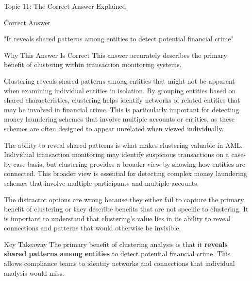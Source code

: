 \documentclass[8pt]{beamer}  %
\newcommand{\correct}{\textcolor{correctgreen}{\ding{51}}}
\begin{document}
	\begin{frame}{Topic 11: The Correct Answer Explained}
		\begin{block}{\large \correct \textcolor{correctgreen}{Correct Answer}}
			\begin{center}
				\Large "It reveals shared patterns among entities to detect potential financial crime"
			\end{center}
		\end{block}
		
		\vspace{0.2cm}
		\begin{block}{\large Why This Answer Is Correct}
			This answer accurately describes the primary benefit of clustering within transaction monitoring systems.
			
			Clustering reveals shared patterns among entities that might not be apparent when examining individual entities in isolation. By grouping entities based on shared characteristics, clustering helps identify networks of related entities that may be involved in financial crime. This is particularly important for detecting money laundering schemes that involve multiple accounts or entities, as these schemes are often designed to appear unrelated when viewed individually.
			
			The ability to reveal shared patterns is what makes clustering valuable in AML. Individual transaction monitoring may identify suspicious transactions on a case-by-case basis, but clustering provides a broader view by showing how entities are connected. This broader view is essential for detecting complex money laundering schemes that involve multiple participants and multiple accounts.
			
			The distractor options are wrong because they either fail to capture the primary benefit of clustering or they describe benefits that are not specific to clustering. It is important to understand that clustering's value lies in its ability to reveal connections and patterns that would otherwise be invisible.
		\end{block}
		
		\begin{alertblock}{Key Takeaway}
			The primary benefit of clustering analysis is that it \textbf{reveals shared patterns among entities} to detect potential financial crime. This allows compliance teams to identify networks and connections that individual analysis would miss.
		\end{alertblock}
	\end{frame}
	
\end{document}
